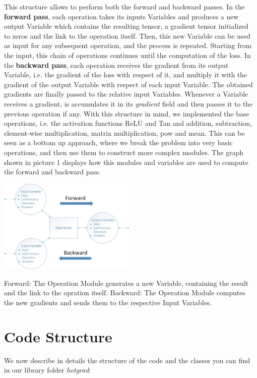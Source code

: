 \documentclass[10pt,conference,compsocconf]{IEEEtran}
\begin{document}
This structure allows to perform both the forward and backward passes. In the \textbf{forward pass}, each operation takes its inputs Variables and produces a new output Variable which contains the resulting tensor, a gradient tensor initialized to zeros and the link to the operation itself. Then, this new Variable can be used as input for any subsequent operation, and the process is repeated. Starting from the input, this chain of operations continues until the computation of the loss. In the \textbf{backward pass}, each operation receives the gradient from its output Variable, i.e. the gradient of the loss with respect of it, and multiply it with the gradient of the output Variable with respect of each input Variable. The obtained gradients are finally passed to the relative input Variables. Whenever a Variable receives a gradient, is accumulates it in its \textit{gradient} field and then passes it to the previous operation if any.
With this structure in mind, we implemented the base operations, i.e. the activation functions ReLU and Tan and addition, subtraction, element-wise multiplication, matrix multiplication, pow and mean. This can be seen as a bottom up approach, where we break the problem into very basic operations, and then use them to construct more complex modules. The graph shown in picture 1  displays how this modules and variables are used to compute the forward and backward pass.

\begin{center}
	\captionsetup{type=figure}
	\includegraphics[width=0.5\textwidth]{img/ForwardBackward.jpg}
	\label{fig:ForwardBackward}
	\caption {Forward: The Operation Module generates a new Variable, containing the result and the link to the opration itself. Backward: The Operation Module computes the new gradients and sends them to the respective Input Variables.}
\end{center}        
        
\section{Code Structure}
We now describe in details the structure of the code and the classes you can find in our library folder \textit{hotgrad}:
\end{document}
